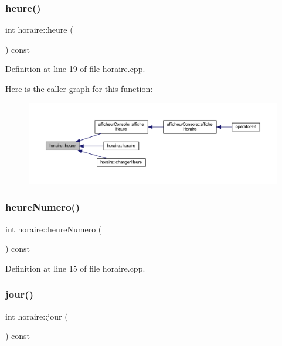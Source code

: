 \subsubsection{\texorpdfstring{heure()}{heure()}}
{\footnotesize\ttfamily int horaire\+::heure (\begin{DoxyParamCaption}{ }\end{DoxyParamCaption}) const}



Definition at line 19 of file horaire.\+cpp.

Here is the caller graph for this function\+:\nopagebreak
\begin{figure}[H]
\begin{center}
\leavevmode
\includegraphics[width=350pt]{classhoraire_a3ddd3f0b63ef3c95802634d9ba072e0a_icgraph}
\end{center}
\end{figure}
\hypertarget{classhoraire_a0acafcfdbd8f9bef79e1cdf9fac128fb}{}\label{classhoraire_a0acafcfdbd8f9bef79e1cdf9fac128fb} 
\subsubsection{\texorpdfstring{heure\+Numero()}{heureNumero()}}
{\footnotesize\ttfamily int horaire\+::heure\+Numero (\begin{DoxyParamCaption}{ }\end{DoxyParamCaption}) const}



Definition at line 15 of file horaire.\+cpp.

\hypertarget{classhoraire_a974c25bda0b56a5abcfa64de32a6ccf0}{}\label{classhoraire_a974c25bda0b56a5abcfa64de32a6ccf0} 
\subsubsection{\texorpdfstring{jour()}{jour()}}
{\footnotesize\ttfamily int horaire\+::jour (\begin{DoxyParamCaption}{ }\end{DoxyParamCaption}) const}



